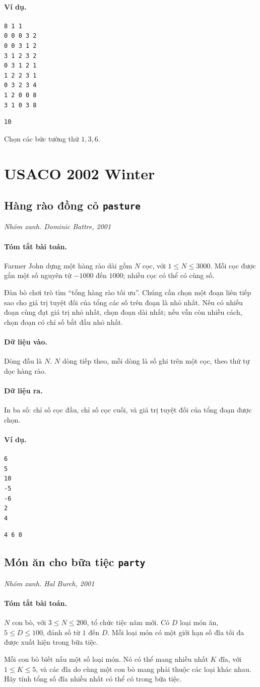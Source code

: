 \documentclass[11pt]{article}
\newcommand{\problem}[4]{%
  \subsection[#1 (#2)]{#1 \hfill {\normalsize\texttt{#2}}}%
  \noindent\textit{#3. #4}\par\smallskip
}
\newcommand{\iosec}[1]{\paragraph{#1}}
\begin{document}
\iosec{Ví dụ.}
\begin{verbatim}
8 1 1
0 0 0 3 2
0 0 3 1 2
3 1 2 3 2
0 3 1 2 1
1 2 2 3 1
0 3 2 3 4
1 2 0 0 8
3 1 0 3 8
\end{verbatim}

\begin{verbatim}
10
\end{verbatim}

Chọn các bức tường thứ \(1,3,6\).

\section{USACO 2002 Winter}

\problem{Hàng rào đồng cỏ}{pasture}{Nhóm xanh}{Dominic Battre, 2001}

\iosec{Tóm tắt bài toán.}
Farmer John dựng một hàng rào dài gồm \(N\) cọc, với \(1\le N\le 3000\). Mỗi
cọc được gắn một số nguyên từ \(-1000\) đến \(1000\); nhiều cọc có thể có cùng
số.

Đàn bò chơi trò tìm ``tổng hàng rào tối ưu''. Chúng cần chọn một đoạn liên
tiếp sao cho giá trị tuyệt đối của tổng các số trên đoạn là nhỏ nhất. Nếu có
nhiều đoạn cùng đạt giá trị nhỏ nhất, chọn đoạn dài nhất; nếu vẫn còn nhiều
cách, chọn đoạn có chỉ số bắt đầu nhỏ nhất.

\iosec{Dữ liệu vào.}
Dòng đầu là \(N\). \(N\) dòng tiếp theo, mỗi dòng là số ghi trên một cọc, theo
thứ tự dọc hàng rào.

\iosec{Dữ liệu ra.}
In ba số: chỉ số cọc đầu, chỉ số cọc cuối, và giá trị tuyệt đối của tổng đoạn
được chọn.

\iosec{Ví dụ.}
\begin{verbatim}
6
5
10
-5
-6
2
4
\end{verbatim}

\begin{verbatim}
4 6 0
\end{verbatim}

\problem{Món ăn cho bữa tiệc}{party}{Nhóm xanh}{Hal Burch, 2001}

\iosec{Tóm tắt bài toán.}
\(N\) con bò, với \(3\le N\le 200\), tổ chức tiệc năm mới. Có \(D\) loại món
ăn, \(5\le D\le 100\), đánh số từ \(1\) đến \(D\). Mỗi loại món có một giới
hạn số đĩa tối đa được xuất hiện trong bữa tiệc.

Mỗi con bò biết nấu một số loại món. Nó có thể mang nhiều nhất \(K\) đĩa, với
\(1\le K\le 5\), và các đĩa do cùng một con bò mang phải thuộc các loại khác
nhau. Hãy tính tổng số đĩa nhiều nhất có thể có trong bữa tiệc.
\end{document}
